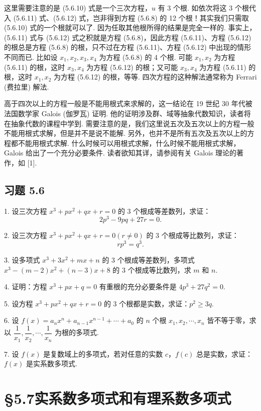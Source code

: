 \documentclass[UTF8, 12pt, fontset=fandol, oneside]{ctexart}
\begin{document}
这里需要注意的是 (5.6.10) 式是一个三次方程，$u$ 有 3 个根. 如依次将这 3 个根代入 (5.6.11) 式、(5.6.12) 式，岂非得到方程 (5.6.8) 的 12 个根！其实我们只需取 (5.6.10) 式的一个根就可以了. 因为任取其他根所得的结果是完全一样的. 事实上，(5.6.11) 式与 (5.6.12) 式之积就是方程 (5.6.8)，因此方程 (5.6.11)、方程 (5.6.12) 的根总是方程 (5.6.8) 的根，只不过在方程 (5.6.11)、方程 (5.6.12) 中出现的情形不同而已. 比如设 $x_1,x_2,x_3,x_4$ 为方程 (5.6.8) 的 4 个根. 可能 $x_1,x_2$ 为方程 (5.6.11) 的根，这时 $x_3,x_4$ 为方程 (5.6.12) 的根；又可能 $x_3,x_4$ 为方程 (5.6.11) 的根，这时 $x_1,x_2$ 为方程 (5.6.12) 的根，等等. 四次方程的这种解法通常称为 Ferrari (费拉里) 解法.

高于四次以上的方程一般是不能用根式来求解的，这一结论在 19 世纪 30 年代被法国数学家 Galois (伽罗瓦) 证明. 他的证明涉及群、域等抽象代数知识，读者将在抽象代数的课程中学到. 需要注意的是，我们这里说五次及五次以上的方程一般不能用根式求解，但是并不是说不能解. 另外，也并不是所有五次及五次以上的方程都不能用根式求解. 什么时候可以用根式求解，什么时候不能用根式求解，Galois 给出了一个充分必要条件. 读者欲知其详，请参阅有关 Galois 理论的著作，如 [1].

\subsection*{习题 5.6}

1. 设三次方程 $x^3+px^2+qx+r=0$ 的 3 个根成等差数列，求证：
\[
2p^3-9pq+27r=0.
\]

2. 设三次方程 $x^3+px^2+qx+r=0(r\neq 0)$ 的 3 个根成等比数列，求证：
\[
rp^3=q^3.
\]

3. 设多项式 $x^3+3x^2+mx+n$ 的 3 个根成等差数列，多项式 $x^3-(m-2)x^2+(n-3)x+8$ 的 3 个根成等比数列，求 $m$ 和 $n$.

4. 证明：方程 $x^3+px+q=0$ 有重根的充分必要条件是 $4p^3+27q^2=0$.

5. 设方程 $x^3+px^2+qx+r=0$ 的 3 个根都是实数，求证：$p^2\geq 3q$.

6. 设 $f(x)=a_nx^n+a_{n-1}x^{n-1}+\cdots+a_0$ 的 $n$ 个根 $x_1,x_2,\cdots,x_n$ 皆不等于零，求以 $\dfrac1{x_1},\dfrac1{x_2},\cdots,\dfrac1{x_n}$ 为根的多项式.

7. 设 $f(x)$ 是复数域上的多项式，若对任意的实数 $c$，$f(c)$ 总是实数，求证：$f(x)$ 是实系数多项式.

\section*{§5.7\quad 实系数多项式和有理系数多项式}
\end{document}
